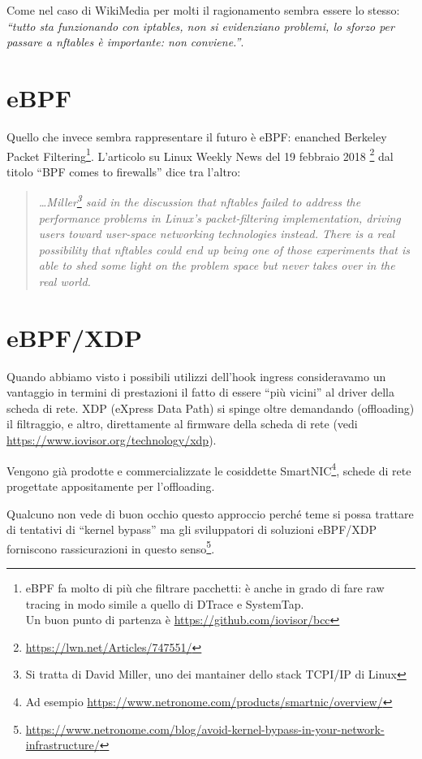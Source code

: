 \noindent Come nel caso di WikiMedia per molti il ragionamento sembra essere lo stesso:
{\em``tutto sta
funzionando con iptables, non si evidenziano problemi, lo sforzo per passare a
    nftables \`e importante: non conviene.''}.

\section{eBPF}

Quello che invece sembra rappresentare il futuro \`e eBPF:
enanched Berkeley Packet Filtering\footnote{eBPF fa molto di pi\`u che filtrare
pacchetti: \`e anche in grado di fare raw tracing in modo simile a quello di
DTrace e SystemTap.\\Un buon punto di partenza \`e
\url{https://github.com/iovisor/bcc}}.
L'articolo su Linux Weekly News del 19 febbraio 2018
\footnote{\url{https://lwn.net/Articles/747551/}} dal titolo ``BPF comes to firewalls''
dice tra l'altro:

\begin{quote}
    {\em \ldots Miller\footnote{Si tratta di David Miller, uno dei mantainer dello stack
TCPI/IP di Linux} said in the discussion that nftables failed to address the
performance problems in Linux's packet-filtering implementation, driving users
toward user-space networking technologies instead. There is a real possibility
that nftables could end up being one of those experiments that is able to shed
some light on the problem space but never takes over in the real world.}
\end{quote}


\section{eBPF/XDP}
Quando abbiamo visto i possibili utilizzi dell'hook ingress consideravamo
un vantaggio in termini di prestazioni il fatto di essere ``pi\`u vicini'' al
driver della scheda di rete. XDP (eXpress Data Path) si spinge oltre
demandando (offloading) il filtraggio, e altro, direttamente al firmware della scheda di
rete (vedi \url{https://www.iovisor.org/technology/xdp}).

Vengono gi\`a prodotte e commercializzate le cosiddette SmartNIC\footnote{Ad esempio
    \url{https://www.netronome.com/products/smartnic/overview/}},
    schede di rete progettate appositamente per l'offloading.
    
    Qualcuno
    non vede di buon occhio questo approccio perch\'e teme si possa trattare di tentativi di
    ``kernel
    bypass'' ma gli sviluppatori di soluzioni eBPF/XDP forniscono
    rassicurazioni in questo senso\footnote{\url{https://www.netronome.com/blog/avoid-kernel-bypass-in-your-network-infrastructure/}}.


